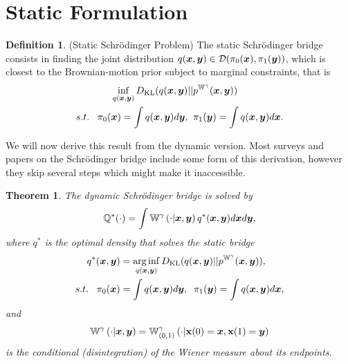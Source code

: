 \documentclass[a4paper,12pt,twoside,openright]{report}
\newtheorem{theorem}{Theorem}
\theoremstyle{definition}
\newtheorem{definition}{Definition}[section]
\begin{document}
\section{Static Formulation}
\begin{definition}\label{def:static_bridge}
    (Static Schrödinger Problem) The static Schrödinger bridge consists in finding the joint distribution $q({\bm{x}}, {\bm{y}}) \in {\mathcal{D}}(\pi_0({\bm{x}}), \pi_1({\bm{y}}))$, which is closest to the Brownian-motion prior subject to marginal constraints, that is
    \begin{align}\label{eq:static_bridge}
        \inf_{q({\bm{x}},{\bm{y}})} D_{\mathrm{KL}} (q({\bm{x}},{\bm{y}})  &|| p^{\mathbb{W}^{\gamma}}({\bm{x}},{\bm{y}})) \nonumber \\
        s.t. \;\;\; \pi_0({\bm{x}}) = \int q({\bm{x}},{\bm{y}}) d{\bm{y}}, &\;\;\pi_1({\bm{y}}) = \int q({\bm{x}},{\bm{y}}) d{\bm{x}}.
    \end{align}
\end{definition}
We will now derive this result from the dynamic version. Most surveys and papers on the Schrödinger bridge include some form of this derivation, however they skip several steps which might make it inaccessible. 
\begin{theorem}\citep{follmer1988random}
    The dynamic Schrödinger bridge is solved by
\begin{align}
    {\mathbb{Q}}^{*} (\cdot) =  \int \mathbb{W}^{\gamma} \left(\cdot | {\bm{x}}, {\bm{y}}\right)  q^{*}({\bm{x}},{\bm{y}}) d{\bm{x}} d{\bm{y}} ,
\end{align}
    where $q^*$ is the optimal density that solves the static bridge
    \begin{align*}
        q^{*}({\bm{x}},{\bm{y}})& = \operatorname*{arg\,inf}_{q({\bm{x}},{\bm{y}})} D_{\mathrm{KL}} (q({\bm{x}},{\bm{y}})  || p^{\mathbb{W}^{\gamma}}({\bm{x}},{\bm{y}})),  \\
        s.t. \;\;\; \pi_0({\bm{x}}) &= \int q({\bm{x}},{\bm{y}}) d{\bm{y}}, \;\;\pi_1({\bm{y}}) = \int q({\bm{x}},{\bm{y}}) d{\bm{x}},
    \end{align*}
    and
    \begin{align*}
        \mathbb{W}^{\gamma} \left(\cdot | {\bm{x}}, {\bm{y}}\right)  = \mathbb{W}_{(0,1)}^{\gamma}\left(\cdot | {\mathbf{x}}(0) ={\bm{x}}, {\mathbf{x}}(1) ={\bm{y}}\right)
    \end{align*}
    is the conditional (disintegration) of the Wiener measure about its endpoints.
\end{theorem} %
\end{document}
